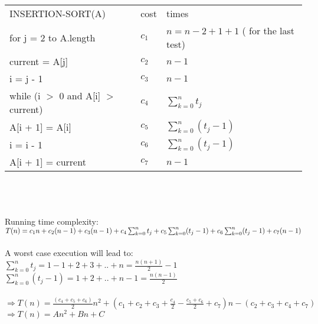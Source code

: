 \documentclass{article}
\begin{document}
\noindent\begin{tabular} {l l l}
INSERTION-SORT(A) &  cost & times\\
\indent for j = 2 to A.length & $c_1$ & $n =  n - 2 + 1 + 1$ ( for the
last test)\\
\indent\indent current = A[j] & $c_2$ & $n - 1$\\
\indent\indent i = j - 1 & $c_3$ & $n - 1$\\
\indent\indent while (i $>$ 0 and A[i] $>$ current) & $c_4$ &
$\sum_{k=0}^{n}t_j$\\
\indent\indent\indent A[i + 1] = A[i] & $c_5$ &
$\sum_{k=0}^{n}(t_j - 1)$\\
\indent\indent\indent i = i - 1 & $c_6$ &
$\sum_{k=0}^{n}(t_j - 1)$\\
\indent\indent A[i + 1] = current & $c_7$ & $n - 1$\\
\end{tabular}
\\\\\\
\noindent Running time complexity:\\
$T(n) = c_1n + c_2(n - 1) + c_3( n - 1) + c_4\sum_{k=0}^{n}t_j + c_5\sum_{k=0}^{n}(t_j - 1)
+ c_6\sum_{k=0}^{n}(t_j - 1)\\ + c_7(n - 1)$\\\\
\noindent A worst case execution will lead to:\\
$\sum_{k=0}^{n} t_j = 1 - 1 + 2 + 3 + .. + n = 
\frac{n(n + 1)}{2} - 1$\\
$\sum_{k=0}^{n}(t_j - 1) = 1 + 2 + .. + n - 1 = \frac{n(n - 1)}{2}$
\\\\
$\Rightarrow T(n) = \frac{(c_4 + c_5 + c_6)}{2} n^2
+ (c_1 + c_2 + c_3 + \frac{c_4}{2} - \frac{c_5 + c_6}{2} + c_7) n
- (c_2 + c_3 + c_4 + c_7) $\\
$\Rightarrow T(n) = An^2 + Bn + C$
\end{document}
